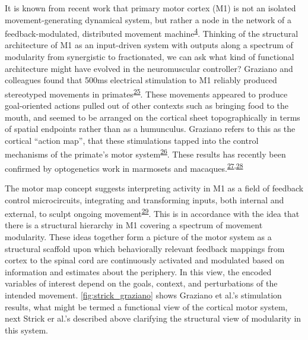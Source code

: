 \documentclass[
  a4paper,
]{article}
\begin{document}
It is known from recent work that primary motor cortex (M1) is not an
isolated movement-generating dynamical system, but rather a node in the
network of a feedback-modulated, distributed movement
machine\textsuperscript{\protect\hyperlink{ref-sauerbreiCorticalPatternGeneration2019}{4}}.
Thinking of the structural architecture of M1 as an input-driven system
with outputs along a spectrum of modularity from synergistic to
fractionated, we can ask what kind of functional architecture might have
evolved in the neuromuscular controller? Graziano and colleagues found
that 500ms electrical stimulation to M1 reliably produced stereotyped
movements in
primates\textsuperscript{\protect\hyperlink{ref-graziano2006}{25}}.
These movements appeared to produce goal-oriented actions pulled out of
other contexts such as bringing food to the mouth, and seemed to be
arranged on the cortical sheet topographically in terms of spatial
endpoints rather than as a humunculus. Graziano refers to this as the
cortical ``action map'', that these stimulations tapped into the control
mechanisms of the primate's motor
system\textsuperscript{\protect\hyperlink{ref-grazianoIntelligentMovementMachine2009}{26}}.
These results has recently been confirmed by optogenetics work in
marmosets and
macaques.\textsuperscript{\protect\hyperlink{ref-ebina2019}{27},\protect\hyperlink{ref-watanabeForelimbMovementsEvoked2020}{28}}

The motor map concept suggests interpreting activity in M1 as a field of
feedback control microcircuits, integrating and transforming inputs,
both internal and external, to sculpt ongoing
movement\textsuperscript{\protect\hyperlink{ref-wiltschkoMappingSubSecondStructure2015}{29}}.
This is in accordance with the idea that there is a structural hierarchy
in M1 covering a spectrum of movement modularity. These ideas together
form a picture of the motor system as a structural scaffold upon which
behaviorally relevant feedback mappings from cortex to the spinal cord
are continuously activated and modulated based on information and
estimates about the periphery. In this view, the encoded variables of
interest depend on the goals, context, and perturbations of the intended
movement. \cref{fig:strick_graziano} shows Graziano et al.'s stimulation
results, what might be termed a functional view of the cortical motor
system, next Strick er al.'s described above clarifying the structural
view of modularity in this system.
\end{document}
